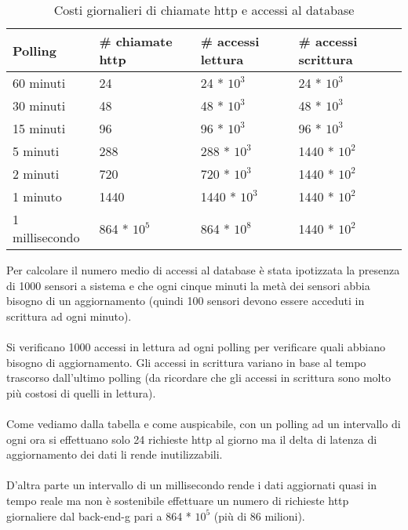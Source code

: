 \renewcommand{\arraystretch}{1.5}
\begin{table}[H]
    \begin{tabular}{|p{2.85cm}|p{3.05cm}|p{3.05cm}|p{3.35cm}|} 
    \hline
    \textbf{Polling} & \textbf{\# chiamate http}  & \textbf{\# accessi lettura} & \textbf{\# accessi scrittura} \\ 
    \hline
    60 minuti & 24 & 24 * $10^3$ & 24 * $10^3$ \\
    \hline
    30 minuti & 48 & 48 * $10^3$ & 48 * $10^3$ \\
    \hline
    15 minuti & 96 & 96 * $10^3$ & 96 * $10^3$ \\
    \hline
    5 minuti & 288 & 288 * $10^3$ & 1440 * $10^2$ \\
    \hline
    2 minuti & 720 & 720 * $10^3$ & 1440 * $10^2$ \\
    \hline
    1 minuto & 1440 & 1440 * $10^3$ & 1440 * $10^2$ \\
    \hline
    1 millisecondo & 864 * $10^5$ & 864 * $10^8$ & 1440 * $10^2$ \\
    \hline
    \end{tabular}
    \caption{Costi giornalieri di chiamate http e accessi al database}
\end{table}
\leavevmode\newline
Per calcolare il numero medio di accessi al database è stata ipotizzata la presenza di 1000 sensori a sistema e che 
ogni cinque minuti la metà dei sensori abbia bisogno di un aggiornamento (quindi 100 sensori devono essere 
acceduti in scrittura ad ogni minuto). 
\\\\
Si verificano 1000 accessi in lettura ad ogni polling per verificare quali abbiano bisogno di aggiornamento.
Gli accessi in scrittura variano in base al tempo trascorso dall'ultimo polling (da ricordare che gli accessi in scrittura sono molto
più costosi di quelli in lettura).
\\\\
Come vediamo dalla tabella e come auspicabile, con un polling ad un intervallo di ogni ora si effettuano solo
24 richieste \gls{http} al giorno ma il delta di latenza di aggiornamento dei dati li rende inutilizzabili.
\\\\
D'altra parte un intervallo di un millisecondo rende i dati aggiornati quasi in tempo reale ma 
non è sostenibile effettuare un numero di richieste \gls{http} giornaliere dal \gls{back-end-g} pari a 864 * $10^5$ (più di 86 milioni).
\leavevmode
